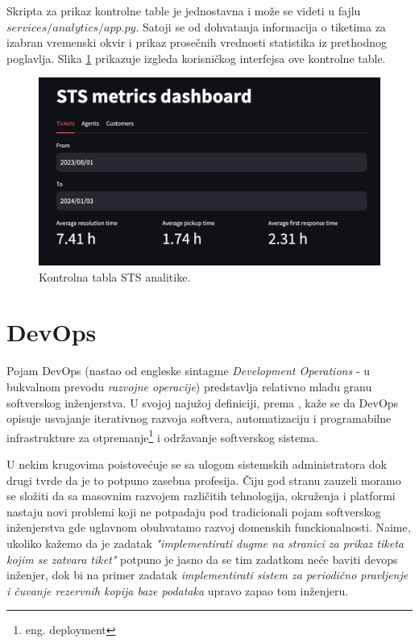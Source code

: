 \documentclass[12pt,oneside]{memoir}
\begin{document}
Skripta za prikaz kontrolne table je jednostavna i može se videti u fajlu $services/analytics/app.py$. Satoji se od dohvatanja informacija o tiketima za izabran vremenski okvir i prikaz prosečnih vrednosti statistika iz prethodnog poglavlja. Slika \ref{fig:stsmetrics} prikazuje izgleda korisničkog interfejsa ove kontrolne table.

\begin{figure}[h]
  \centering
  \includegraphics[width=1\textwidth]{docs/images/ch_5/stsmetrics.png} 
  \caption{Kontrolna tabla STS analitike.}
  \label{fig:stsmetrics}
\end{figure}


\chapter{DevOps}

Pojam DevOps (nastao od engleske sintagme \textit{Development Operations} - u bukvalnom prevodu \textit{razvojne operacije}) predstavlja relativno mladu granu softverskog inženjerstva. U svojoj najužoj definiciji, prema \cite{zdevopsarticle}, kaže se da DevOps opisuje usvajanje iterativnog razvoja softvera, automatizaciju i programabilne infrastrukture za otpremanje\footnote{eng. deployment} i održavanje softverskog sistema.

U nekim krugovima poistovećuje se sa ulogom sistemskih administratora dok drugi tvrde da je to potpuno zasebna profesija. Čiju god stranu zauzeli moramo se složiti da sa masovnim razvojem različitih tehnologija, okruženja i platformi nastaju novi problemi koji ne potpadaju pod tradicionali pojam softverskog inženjerstva gde uglavnom obuhvatamo razvoj domenskih funckionalnosti. Naime, ukoliko kažemo da je zadatak \textit{"implementirati dugme na stranici za prikaz tiketa kojim se zatvara tiket"} potpuno je jasno da se tim zadatkom neće baviti devops inženjer, dok bi na primer zadatak \textit{implementirati sistem za periodično pravljenje i čuvanje rezervnih kopija baze podataka} upravo zapao tom inženjeru.
\end{document}
